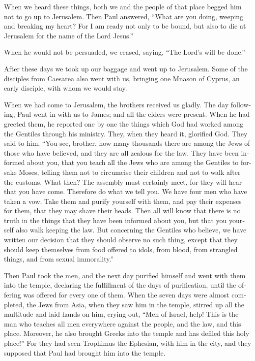 \begin{paracol}{2}
\begin{otherlanguage}{english}
 When we heard these things, both we and the people of
that place begged him not to go up to Jerusalem.  Then
Paul answered, ``What are you doing, weeping and breaking my heart? For
I am ready not only to be bound, but also to die at Jerusalem for the
name of the Lord Jesus.''

 When he would not be persuaded, we ceased, saying, ``The
Lord's will be done.''

 After these days we took up our baggage and went up to
Jerusalem.  Some of the disciples from Caesarea also went
with us, bringing one Mnason of Cyprus, an early disciple, with whom we
would stay.

 When we had come to Jerusalem, the brothers received us
gladly.  The day following, Paul went in with us to
James; and all the elders were present.  When he had
greeted them, he reported one by one the things which God had worked
among the Gentiles through his ministry.  They, when they
heard it, glorified God. They said to him, ``You see, brother, how many
thousands there are among the Jews of those who have believed, and they
are all zealous for the law.  They have been informed
about you, that you teach all the Jews who are among the Gentiles to
forsake Moses, telling them not to circumcise their children and not to
walk after the customs.  What then? The assembly must
certainly meet, for they will hear that you have come. 
Therefore do what we tell you. We have four men who have taken a vow.
 Take them and purify yourself with them, and pay their
expenses for them, that they may shave their heads. Then all will know
that there is no truth in the things that they have been informed about
you, but that you yourself also walk keeping the law. 
But concerning the Gentiles who believe, we have written our decision
that they should observe no such thing, except that they should keep
themselves from food offered to idols, from blood, from strangled
things, and from sexual immorality.''

 Then Paul took the men, and the next day purified
himself and went with them into the temple, declaring the fulfillment of
the days of purification, until the offering was offered for every one
of them.  When the seven days were almost completed, the
Jews from Asia, when they saw him in the temple, stirred up all the
multitude and laid hands on him,  crying out, ``Men of
Israel, help! This is the man who teaches all men everywhere against the
people, and the law, and this place. Moreover, he also brought Greeks
into the temple and has defiled this holy place!''  For
they had seen Trophimus the Ephesian, with him in the city, and they
supposed that Paul had brought him into the temple.


\end{otherlanguage}
\end{paracol}
